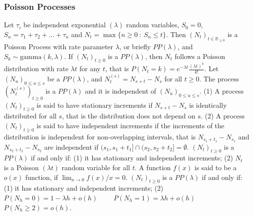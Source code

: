 \subsubsection*{Poisson Processes}
 Let $\tau_i$ be independent exponential $(\lambda)$ random variables, $S_0 = 0$, $S_n = \tau_1 + \tau_2 + \ldots + \tau_n$ and $N_t = \max\{n \ge 0\ :\ S_n \le t\}$. Then $(N_t)_{t \in \mathbb{R}_{\ge 0}}$ is a Poisson Process with rate parameter $\lambda$, or briefly $PP(\lambda)$, and $S_k \sim \mathrm{gamma}(k, \lambda)$.
 If $(N_t)_{t \ge 0}$ is a $PP(\lambda)$, then $N_t$ follows a Poisson distribution with rate $\lambda t$ for any $t$, that is $P(N_t = k) = e^{-\lambda t}\frac{(\lambda t)^k}{k!}$.
 Let $(N_u)_{0 \le u \le s}$ be a  $PP(\lambda)$, and $N^{(s)}_t = N_{s+t}-N_s$ for all $t \ge 0$. The process $(N^{(s)}_t)_{t \ge 0}$ is a $PP(\lambda)$ and it is independent of $(N_u)_{0 \le u \le s}$.
(1) A process $(N_t)_{t \ge 0}$  is said to have stationary increments if $N_{s+t} - N_s$ is identically distributed for all $s$, that is the distribution does not depend on $s$.
(2) A process $(N_t)_{t \ge 0}$ is said to have independent increments if the increments of the distribution is independent for non-overlapping intervals, that is $N_{s_1 + t_1} - N_{s_1}$ and $N_{s_2 + t_2} -N_{s_2}$ are independent if $(s_1,s_1 + t_1] \cap (s_2,s_2 + t_2] = \emptyset$.
 $(N_t)_{t \ge 0}$ is a $PP(\lambda)$ if and only if: 
(1) it has stationary and independent increments; 
(2) $N_t$ is a Poisson $(\lambda t)$ random variable for all $t$.
 A function $f(x)$ is said to be a $o(x)$ function, if $\lim_{x \to 0} f(x)/x = 0$.
 $(N_t)_{t \ge 0}$ is a $PP(\lambda)$ if and only if: 
(1) it has stationary and independent increments;
(2) $P(N_h = 0) = 1 -\lambda h +o(h) \qquad$ 
$P(N_h = 1) = \lambda h + o(h) \qquad$ 
$P(N_h \ge 2) = o(h)$.